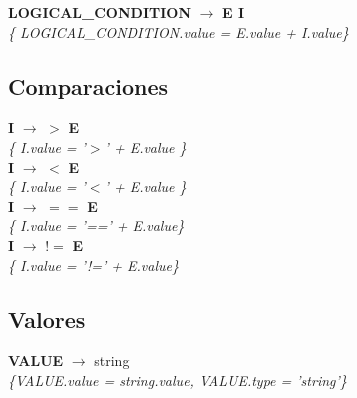 \documentclass[10pt,a4paper]{article}
\begin{document}
\textbf{LOGICAL\_CONDITION} $\rightarrow$ \textbf{E I} \\
\textit{\{ LOGICAL\_CONDITION.value = E.value + I.value\}} \\







\subsection{Comparaciones}
\textbf{I} $\rightarrow$ $>$ \textbf{E} \\
\textit{\{ I.value = '$>$' + E.value  \}} \\

\textbf{I} $\rightarrow$ $<$ \textbf{E}\\
\textit{\{ I.value = '$<$' + E.value  \}} \\

\textbf{I} $\rightarrow$ $==$ \textbf{E}\\
\textit{\{ I.value =  '==' + E.value\}} \\

\textbf{I} $\rightarrow$ $!=$ \textbf{E}\\
\textit{\{ I.value =  '!=' + E.value\}} \\

\subsection{Valores}
\textbf{VALUE} $\rightarrow$ string \\
\textit{\{VALUE.value = string.value, VALUE.type = 'string'\}} \\
\end{document}
